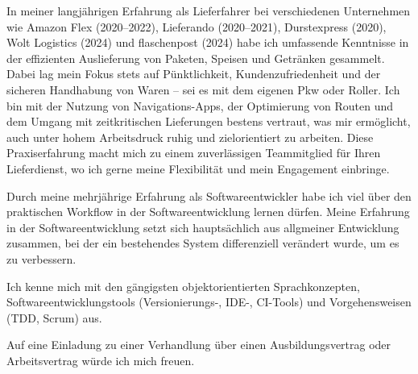 		In meiner langjährigen Erfahrung als Lieferfahrer bei verschiedenen Unternehmen wie Amazon Flex (2020–2022), Lieferando (2020–2021), Durstexpress (2020), Wolt Logistics (2024) und flaschenpost (2024) habe ich umfassende Kenntnisse in der effizienten Auslieferung von Paketen, Speisen und Getränken gesammelt.
		Dabei lag mein Fokus stets auf Pünktlichkeit, Kundenzufriedenheit und der sicheren Handhabung von Waren – sei es mit dem eigenen Pkw oder Roller.
		Ich bin mit der Nutzung von Navigations-Apps, der Optimierung von Routen und dem Umgang mit zeitkritischen Lieferungen bestens vertraut, was mir ermöglicht, auch unter hohem Arbeitsdruck ruhig und zielorientiert zu arbeiten.
		Diese Praxiserfahrung macht mich zu einem zuverlässigen Teammitglied für Ihren Lieferdienst, wo ich gerne meine Flexibilität und mein Engagement einbringe.

		Durch meine mehrjährige Erfahrung als Softwareentwickler habe ich viel über den praktischen Workflow in der Softwareentwicklung lernen dürfen.
		Meine Erfahrung in der Softwareentwicklung setzt sich hauptsächlich aus allgmeiner Entwicklung zusammen, bei der ein bestehendes System differenziell verändert wurde, um es zu verbessern.

		Ich kenne mich mit den gängigsten objektorientierten Sprachkonzepten, Softwareentwicklungstools (Versionierungs-, IDE-, CI-Tools) und Vorgehensweisen (TDD, Scrum) aus.

		Auf eine Einladung zu einer Verhandlung über einen Ausbildungsvertrag oder Arbeitsvertrag würde ich mich freuen.